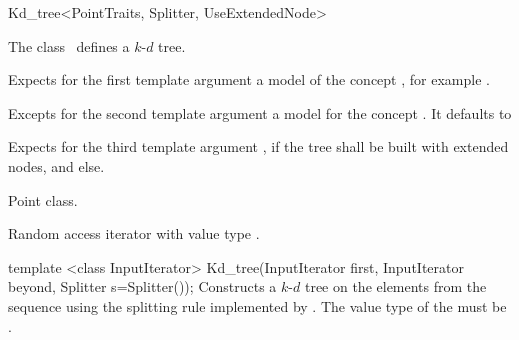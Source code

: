 

\begin{ccRefClass}{Kd_tree<PointTraits, Splitter, UseExtendedNode>}  %


\ccDefinition  
The class \ccRefName\ defines a $k$-$d$ tree.


\ccParameters

Expects for the first template argument a model of the concept
, for example .

Excepts for the second template argument a model for the concept .
It defaults  to 

Expects for the third template argument , if the 
tree shall be built with extended nodes, and  else.

\ccTypes

 {Point class.}

\begin{ccAdvanced}
 {Random access iterator 
with value type .}
\end{ccAdvanced}

\ccCreation
{}

\ccConstructor
{template <class InputIterator> Kd_tree(InputIterator first, InputIterator beyond, Splitter s=Splitter());}
{
Constructs a $k$-$d$ tree on the elements from the sequence 
 using the splitting rule implemented by . 
The value type of the  must be .
}


\end{ccRefClass}
